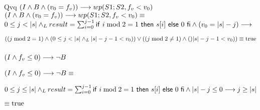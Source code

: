 \documentclass{article}
\begin{document}
Qvq $(I \wedge B \wedge (v_{0} = f_{v})) \longrightarrow wp(S1;S2, f_{v} < v_{0})$ \\

$(I \wedge B \wedge (v_{0} = f_{v})) \longrightarrow wp(S1;S2, f_{v} < v_{0}) \equiv$ \\

$0 \leq j < |s| \land _L result = \sum_{i=0}^{j-1} \mathsf{if}\ i \bmod 2 = 1\ \mathsf{then}\ s[i]\ \mathsf{else}\ 0\ \mathsf{fi} \wedge (v_{0} = |s|-j)\longrightarrow$

$((j \bmod 2 = 1) \wedge (0 \leq j < |s| \land _L |s|-j-1<v_{0})) \vee ((j \bmod 2 \neq 1) \wedge ()|s|-j-1<v_{0})) \equiv \mathrm{true}$

\subsubsection*{$(I \wedge f_{v} \leq 0) \longrightarrow \neg B$}

$(I \wedge f_{v} \leq 0) \longrightarrow \neg B \equiv $

$0 \leq j \leq |s| \land _L result = \sum_{i=0}^{j-1} \mathsf{if}\ i \bmod 2 = 1\ \mathsf{then}\ s[i]\ \mathsf{else}\ 0\ \mathsf{fi} \wedge |s|-j \leq 0 \longrightarrow j \geq |s| $

$\equiv \mathrm{true}$
\end{document}
